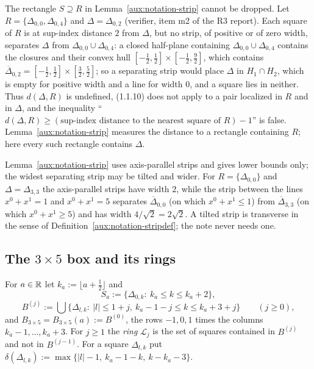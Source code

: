 \begin{auxrem}\label{aux:notation-counterex}
The rectangle $S\supseteq R$ in Lemma~\ref{aux:notation-strip} cannot be dropped.  Let
$R=\{\Delta_{0,0},\Delta_{0,4}\}$ and $\Delta=\Delta_{0,2}$ (verifier, item m2 of the R3
report).  Each square of $R$ is at sup-index distance $2$ from $\Delta$, but no strip, of
positive or of zero width, separates $\Delta$ from $\Delta_{0,0}\cup\Delta_{0,4}$: a closed
half-plane containing $\Delta_{0,0}\cup\Delta_{0,4}$ contains the closures and their convex
hull $[-\frac12,\frac12]\times[-\frac12,\frac92]$, which contains
$\overline\Delta_{0,2}=[-\frac12,\frac12]\times[\frac32,\frac52]$; so a separating strip would
place $\Delta$ in $H_1\cap H_2$, which is empty for positive width and a line for width
$0$, and a square lies in neither.  Thus $d(\Delta,R)$ is undefined, (1.1.10) does not apply
to a pair localized in $R$ and in $\Delta$, and the inequality
``$d(\Delta,R)\ge(\text{sup-index distance to the nearest square of }R)-1$'' is false.
Lemma~\ref{aux:notation-strip} measures the distance to a rectangle containing $R$; here
every such rectangle contains $\Delta$.
\end{auxrem}

\begin{auxrem}\label{aux:notation-tilted}
Lemma~\ref{aux:notation-strip} uses axis-parallel strips and gives lower bounds only; the
widest separating strip may be tilted and wider.  For $R=\{\Delta_{0,0}\}$ and
$\Delta=\Delta_{3,3}$ the axis-parallel strips have width $2$, while the strip between the
lines $x^0+x^1=1$ and $x^0+x^1=5$ separates $\overline\Delta_{0,0}$ (on which $x^0+x^1\le1$)
from $\overline\Delta_{3,3}$ (on which $x^0+x^1\ge5$) and has width $4/\sqrt2=2\sqrt2$.  A
tilted strip is transverse in the sense of Definition~\ref{aux:notation-stripdef}; the note
never needs one.
\end{auxrem}

\subsection{The $3\times5$ box and its rings}\label{sec:notation-rings}

\begin{auxdef}\label{aux:notation-ringdef}
For $a\in\mathbb{R}$ let $k_a:=\lfloor a+\frac12\rfloor$ and
\[
 S_a:=\{\Delta_{0,k}:\ k_a\le k\le k_a+2\},
\]
\[
 B^{(j)}:=\bigcup\{\Delta_{l,k}:\ |l|\le1+j,\ k_a-1-j\le k\le k_a+3+j\}\qquad(j\ge0),
\]
and $B_{3\times5}=B_{3\times5}(a):=B^{(0)}$, the rows $-1,0,1$ times the columns
$k_a-1,\dots,k_a+3$.  For $j\ge1$ the \emph{ring} $\mathcal L_j$ is the set of squares
contained in $B^{(j)}$ and not in $B^{(j-1)}$.  For a square $\Delta_{l,k}$ put
$\delta(\Delta_{l,k}):=\max\{|l|-1,\ k_a-1-k,\ k-k_a-3\}$.
\end{auxdef}

